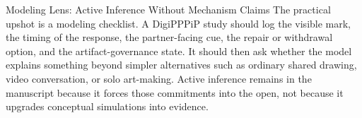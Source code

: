 \documentclass[
  ignorenonframetext,
]{beamer}
\begin{document}
\begin{frame}{Modeling Lens: Active Inference
Without Mechanism Claims}
The practical upshot is a modeling checklist. A DigiPPPiP study should
log the visible mark, the timing of the response, the partner-facing
cue, the repair or withdrawal option, and the artifact-governance state.
It should then ask whether the model explains something beyond simpler
alternatives such as ordinary shared drawing, video conversation, or
solo art-making. Active inference remains in the manuscript because it
forces those commitments into the open, not because it upgrades
conceptual simulations into evidence.
\end{frame}
\end{document}
